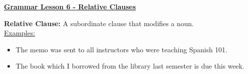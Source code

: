 \documentclass[12pt]{article} %
\begin{document}
	\renewcommand*{\coursecode}{MATH 235} %
	\renewcommand*{\assgnnumber}{Assignment 1} %
	\renewcommand*{\submdate}{September 14, 2021} %
	\renewcommand*{\studentfname}{Abdullah} %
	\renewcommand*{\studentlname}{Zubair} %
    \renewcommand*{\proofname}{Proof:}

	\renewcommand\qedsymbol{$\blacksquare$}
	\setfigpath
	\fancyhfoffset[L,O]{0pt} %





\begin{center}
  \textbf{\underline{\Huge{Grammar Lesson 6 - Relative Clauses}}}
\end{center}

\textbf{Relative Clause:} A subordinate clause that modifies a noun.\\
\underline{Examples:}
\begin{itemize}
  \item The memo was sent to all instructors who were teaching Spanish 101.
  \item The book which I borrowed from the library last semester is due this week.
\end{itemize}
\end{document}
